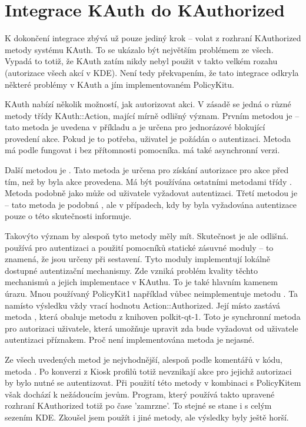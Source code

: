 {\section{Integrace KAuth do KAuthorized}
K dokončení integrace zbývá už pouze jediný krok -- volat z rozhraní KAuthorized metody systému KAuth. To se ukázalo být největším problémem ze všech. Vypadá to totiž, že KAuth zatím nikdy nebyl použit v takto velkém rozahu (autorizace všech akcí v KDE). Není tedy překvapením, že tato integrace odkryla některé problémy v KAuth a jím implementovaném PolicyKitu.

KAuth nabízí několik možností, jak autorizovat akci. V zásadě se jedná o různé metody třídy KAuth::Action, mající mírně odlišný význam. Prvním metodou je  -- tato metoda je uvedena v příkladu \cite{Kauth-usage} a je určena pro jednorázové blokující provedení akce. Pokud je to potřeba, uživatel je požádán o autentizaci. Metoda má podle \cite{Kauth-usage} fungovat i bez přítomnosti pomocníka.  má také asynchronní verzi.

Další metodou je . Tato metoda je určena pro získání autorizace pro akce před tím, než by byla akce provedena. Má být používána ostatními metodami třídy .  Metoda podobně jako  může od uživatele vyžadovat autentizaci. Třetí metodou je  -- tato metoda je podobná , ale v případech, kdy by byla vyžadována autentizace pouze o této skutečnosti
informuje.

Takovýto význam by alespoň tyto metody měly mít. Skutečnost je ale odlišná.  používá pro autentizaci a použití pomocníků statické zásuvné moduly -- to znamená, že jsou určeny při sestavení. Tyto moduly implementují lokálně dostupné autentizační mechanismy. Zde vzniká problém kvality těchto mechanismů a jejich implementace v KAuthu. To je také hlavním kamenem úrazu. Mnou používaný PolicyKit1 například vůbec neimplementuje metodu . Ta namísto výsledku vždy vrací hodnotu Action::Authorized. Její místo zastává metoda , která obaluje metodu  z knihoven polkit-qt-1. Toto je synchronní metoda pro autorizaci uživatele, která umožňuje
upravit zda bude vyžadovat od uživatele autentizaci příznakem. Proč není implementována metoda  je nejasné.

Ze všech uvedených metod je nejvhodnější, alespoň podle komentářů v kódu, metoda . Po konverzi z Kiosk profilů totiž nevznikají akce pro jejichž autorizaci by bylo nutné se autentizovat. Při použití této metody v kombinaci s PolicyKitem však dochází k nežádoucím jevům. Program, který používá takto upravené rozhraní KAuthorized totiž po čase 'zamrzne'. To stejné se stane i s celým sezením KDE. Zkoušel jsem použít i jiné metody, ale výsledky byly ještě horší.

}
